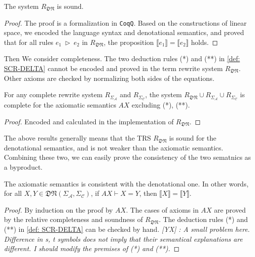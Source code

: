 \documentclass[manuscript, review, timestamp]{acmart}
\newcommand{\yx}[1]{\textit{\color{blue}[YX] : #1}}
\newcommand*{\reduce}{\ \triangleright\ }
\newcommand*{\sem}[1]{\llbracket #1 \rrbracket}
\begin{document}
\begin{lemma}
  The system $R_\mathfrak{DN}$ is sound.
\end{lemma}
\begin{proof}
  The proof is a formalization in \texttt{CoqQ}. Based on the constructions of linear space, we encoded the language syntax and denotational semantics, and proved that for all rules $e_1 \reduce e_2$ in $R_\mathfrak{DN}$, the proposition $\sem{e_1} = \sem{e_2}$ holds.
\end{proof}

Then We consider completeness. The two deduction rules (*) and (**) in \ref{def: SCR-DELTA} cannot be encoded and proved in the term rewrite system $R_\mathfrak{DN}$. Other axioms are checked by normalizing both sides of the equations.

\begin{lemma}
  For any complete rewrite system $R_{\Sigma_\mathcal{A}}$ and $R_{\Sigma_\mathcal{C}}$, the system $R_\mathfrak{DN}\cup R_{\Sigma_\mathcal{A}} \cup R_{\Sigma_\mathcal{C}}$ is complete for the axiomatic semantics $AX$ excluding (*), (**).
\end{lemma}
\begin{proof}
  Encoded and calculated in the implementation of $R_\mathfrak{DN}$.
\end{proof}

The above results generally means that the TRS $R_\mathfrak{DN}$ is sound for the denotational semantics, and is not weaker than the axiomatic semantics. Combining these two, we can easily prove the consistency of the two sematnics as a byproduct.

\begin{corollary}
  The axiomatic semantics is consistent with the denotational one. In other words, for all $X, Y \in \mathfrak{DN}(\Sigma_\mathcal{A}, \Sigma_\mathcal{C})$, if $AX \vdash X = Y$, then $\sem{X} = \sem{Y}$.
\end{corollary}
\begin{proof}
  By induction on the proof by $AX$. The cases of axioms in $AX$ are proved by the relative completeness and soundness of $R_\mathfrak{DN}$. The deduction rules (*) and (**) in \ref{def: SCR-DELTA} can be checked by hand.
  \yx{A small problem here. Difference in s, t symbols does not imply that their semantical explanations are different. I should modify the premises of (*) and (**).}
\end{proof}
\end{document}
